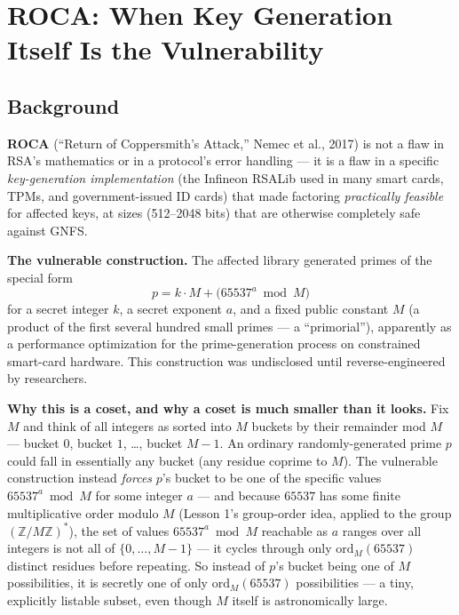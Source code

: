\newpage
\section{ROCA: When Key Generation Itself Is the Vulnerability}

\subsection{Background}

\textbf{ROCA} (``Return of Coppersmith's Attack,'' Nemec et al., 2017) is not a flaw in RSA's mathematics or in a protocol's error handling — it is a flaw in a specific \emph{key-generation implementation} (the Infineon RSALib used in many smart cards, TPMs, and government-issued ID cards) that made factoring \emph{practically feasible} for affected keys, at sizes (512--2048 bits) that are otherwise completely safe against GNFS.

\medskip\noindent\textbf{The vulnerable construction.} The affected library generated primes of the special form
\[
p = k \cdot M + \big(65537^{a} \bmod M\big)
\]
for a secret integer $k$, a secret exponent $a$, and a fixed public constant $M$ (a product of the first several hundred small primes — a ``primorial''), apparently as a performance optimization for the prime-generation process on constrained smart-card hardware. This construction was undisclosed until reverse-engineered by researchers.

\medskip\noindent\textbf{Why this is a coset, and why a coset is much smaller than it looks.} Fix $M$ and think of all integers as sorted into $M$ buckets by their remainder mod $M$ — bucket $0$, bucket $1$, \dots, bucket $M-1$. An ordinary randomly-generated prime $p$ could fall in essentially any bucket (any residue coprime to $M$). The vulnerable construction instead \emph{forces} $p$'s bucket to be one of the specific values $65537^a\bmod M$ for some integer $a$ — and because $65537$ has some finite multiplicative order modulo $M$ (Lesson 1's group-order idea, applied to the group $(\mathbb{Z}/M\mathbb{Z})^{*}$), the set of values $65537^a\bmod M$ reachable as $a$ ranges over all integers is not all of $\{0,\dots,M-1\}$ — it cycles through only $\mathrm{ord}_M(65537)$ distinct residues before repeating. So instead of $p$'s bucket being one of $M$ possibilities, it is secretly one of only $\mathrm{ord}_M(65537)$ possibilities — a tiny, explicitly listable subset, even though $M$ itself is astronomically large.

